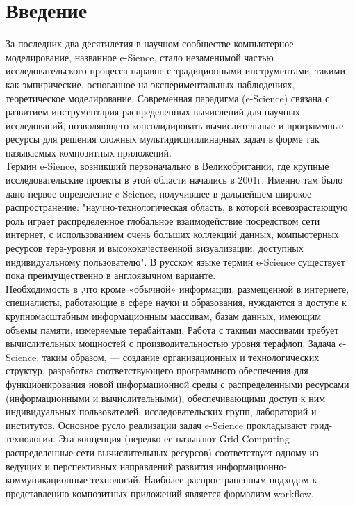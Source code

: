 \documentclass[a4paper,12pt]{article}
\begin{document}
\textwidth 15.5cm
\topmargin -1cm
\parindent 1cm
\textheight 24cm
\parskip 1.5mm



\newpage
\section{Введение}

За последних два десятилетия в научном сообществе компьютерное моделирование, названное e-Sience, стало незаменимой частью исследовательского процесса наравне с традиционными инструментами, такими как эмпирические, основанное на  экспериментальных наблюдениях, теоретическое моделирование. Современная парадигма (e-Science) связана с развитием инструментария распределенных вычислений для научных исследований, позволяющего консолидировать вычислительные и программные ресурсы для решения сложных мультидисциплинарных задач в форме так называемых композитных приложений.\\ 

Термин e-Sience, возникший первоначально в Великобритании, где крупные исследовательские проекты в этой области начались в 2001г. Именно там было дано первое определение e-Science, получившее в дальнейшем широкое распространение: "научно-технологическая область, в которой всевозрастающую роль играет распределенное глобальное взаимодействие посредством сети интернет, с использованием очень больших коллекций данных, компьютерных ресурсов тера-уровня и высококачественной визуализации, доступных индивидуальному
пользователю". В русском языке термин e-Science существует пока преимущественно в англоязычном варианте.\\
 Необходимость в ,что кроме «обычной» информации, размещенной в интернете, специалисты, работающие в сфере науки и образования, нуждаются в доступе к крупномасштабным информационным массивам, базам данных, имеющим объемы памяти, измеряемые терабайтами. Работа с такими массивами
требует вычислительных мощностей с производительностью уровня терафлоп.  
Задача e-Science, таким образом, — создание организационных и технологических структур, разработка соответствующего программного обеспечения для функционирования новой информационной среды с
распределенными ресурсами (информационными и вычислительными), обеспечивающими доступ к ним индивидуальных пользователей, исследовательских групп, лабораторий и институтов.
Основное русло реализации задач e-Science прокладывают грид-технологии. Эта концепция (нередко ее называют Grid Computing — распределенные сети вычислительных ресурсов) соответствует
одному из ведущих и перспективных направлений развития информационно-коммуникационные технологий.
Наиболее распространенным подходом к представлению композитных приложений является формализм workflow. 
\end{document}
